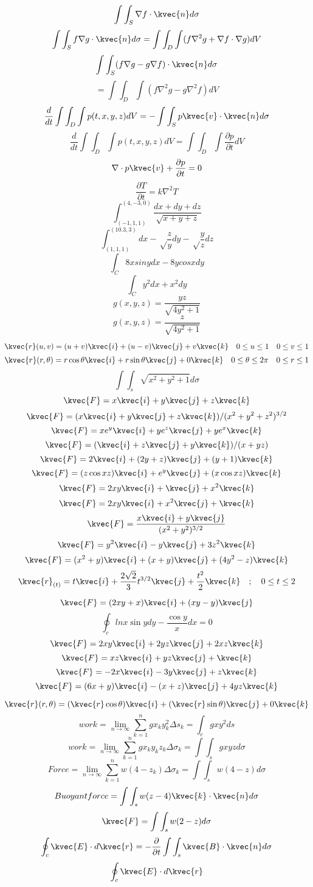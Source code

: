 \[\int\int_{S}\nabla f\cdot\kvec{n}d\sigma\]
\[\int\int_{S}f\nabla g\cdot\kvec{n}d\sigma=\int\int_{D}\int(f\nabla^{2}g+\nabla f\cdot\nabla g)dV\]
\[\int\int_{S}(f\nabla g-g\nabla f)\cdot\kvec{n}d\sigma\]
\[=\int\int_{D}\int(f\nabla^{2}g-g\nabla^{2}f)dV\]
\[\frac{d}{dt}\int\int_{D}\int p(t,x,y,z)dV=-\int\int_{S}p\kvec{v}\cdot\kvec{n}d\sigma\]
\[\frac{d}{dt}\int\int_{D}\int p(t,x,y,z)dV=\int\int_{D}\int\frac{\partial p}{\partial t}dV\]
\[\nabla\cdot p\kvec{v}+\frac{\partial p}{\partial t}=0\]
\[\frac{\partial T}{\partial t}=k\nabla^{2}T\]
\[\int^{(4,-3,0)}_{(-1,1,1)}\frac{dx+dy+dz}{\sqrt{x+y+z}}\]
\[\int^{(10.3,3)}_{(1,1,1)}dx-\sqrt\frac{z}{y}dy-\sqrt\frac{y}{z}dz\]
\[\int_{C}8xsinydx-8ycosxdy\]
\[\int_{C}y^{2}dx+x^{2}dy\]
\[g(x,y,z)=\frac{yz}{\sqrt{4y^{2}+1}}\]
\[g(x,y,z)=\frac{z}{\sqrt{4y^{2}+1}}\]





\[\kvec{r}(u,v)=(u+v)\kvec{i}+(u-v)\kvec{j}+v\kvec{k}\quad 0\leq{u}\leq{1}\quad 0\leq{v}\leq{1}\]
\[\kvec{r}(r,\theta)=r\cos\theta\kvec{i}+r\sin\theta\kvec{j}+0\kvec{k}\quad 0\leq{\theta}\leq{2\pi}\quad 0\leq{r}\leq{1}\]
\[\int\int_{s}\sqrt{x^{2}+y^{2}+1}d\sigma\]
\[\kvec{F}=x\kvec{i}+y\kvec{j}+z\kvec{k}\]
\[\kvec{F}=(x\kvec{i}+y\kvec{j}+z\kvec{k})/(x^{2}+y^{2}+z^{2})^{3/2}\]
\[\kvec{F}=xe^{y}\kvec{i}+ye^{z}\kvec{j}+ye^{x}\kvec{k}\]
\[\kvec{F}=(\kvec{i}+z\kvec{j}+y\kvec{k})/(x+yz)\]
\[\kvec{F}=2\kvec{i}+(2y+z)\kvec{j}+(y+1)\kvec{k}\]
\[\kvec{F}=(z\cos{xz})\kvec{i}+e^{y}\kvec{j}+(x\cos{xz})\kvec{k}\]
\[\kvec{F}=2xy\kvec{i}+\kvec{j}+x^{2}\kvec{k}\]
\[\kvec{F}=2xy\kvec{i}+x^{2}\kvec{j}+\kvec{k}\]
\[\kvec{F}=\frac{x\kvec{i}+y\kvec{j}}{(x^{2}+y^{2})^{3/2}}\]
\[\kvec{F}=y^{2}\kvec{i}-y\kvec{j}+3z^{2}\kvec{k}\]
\[\kvec{F}=(x^{2}+y)\kvec{i}+(x+y)\kvec{j}+(4y^{2}-z)\kvec{k}\]
\[\kvec{r}_{(t)}=t\kvec{i}+\frac{2\sqrt{2}}{3}t^{3/2}\kvec{j}+\frac{t^{2}}{2}\kvec{k}\quad ;\quad 0\leq{t}\leq{2}\]

\[\kvec{F}=(2xy+x)\kvec{i}+(xy-y)\kvec{j}\]
\[\oint_{c}ln x\sin ydy-\frac{\cos y}{x}dx=0\]
\[\kvec{F}=2xy\kvec{i}+2yz\kvec{j}+2xz\kvec{k}\]
\[\kvec{F}=xz\kvec{i}+yz\kvec{j}+\kvec{k}\]
\[\kvec{F}=-2x\kvec{i}-3y\kvec{j}+z\kvec{k}\]
\[\kvec{F}=(6x+y)\kvec{i}-(x+z)\kvec{j}+4yz\kvec{k}\]

\[\kvec{r}(r,\theta)=(\kvec{r}\cos\theta)\kvec{i}+(\kvec{r}\sin\theta)\kvec{j}+0\kvec{k}\]
\[work=\lim_{n\to\infty}\sum^{n}_{k=1}gx_{k}y_{k}^{2}\Delta s_{k}=\int_{c}gxy^{2}ds\]
\[work=\lim_{n\to\infty}\sum^{n}_{k=1}gx_{k}y_{k}z_{k}\Delta\sigma_{k}=\int\int_{s}gxyzd\sigma\]
\[Force=\lim_{n\to\infty}\sum^{n}_{k=1}w(4-z_{k})\Delta\sigma_{k}=\int\int_{s}w(4-z)d\sigma\]
\[Buoyant force=\int\int_{s}w(z-4)\kvec{k}\cdot\kvec{n}d\sigma\]
\[\kvec{F}=\int\int_{s}w(2-z)d\sigma\]
\[\oint_{c}\kvec{E}\cdot d\kvec{r}=-\frac{\partial}{\partial t}\int\int_{s}\kvec{B}\cdot\kvec{n}d\sigma\]
\[\oint_{c}\kvec{E}\cdot d\kvec{r}\]

